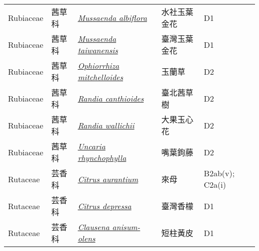 {\begin{longtable}{L{2.5cm}L{2cm}L{5cm}L{2.5cm}L{3cm}}
    Rubiaceae & 茜草科 & \href{http://www.theplantlist.org/tpl1.1/search?q=Mussaenda+albiflora}{\textit{Mussaenda albiflora} } & 水社玉葉金花 & D1    \\
    Rubiaceae & 茜草科 & \href{http://www.theplantlist.org/tpl1.1/search?q=Mussaenda+taiwanensis}{\textit{Mussaenda taiwanensis} } & 臺灣玉葉金花 & D1    \\
    Rubiaceae & 茜草科 & \href{http://www.theplantlist.org/tpl1.1/search?q=Ophiorrhiza+mitchelloides}{\textit{Ophiorrhiza mitchelloides} } & 玉蘭草 & D2    \\
    Rubiaceae & 茜草科 & \href{http://www.theplantlist.org/tpl1.1/search?q=Randia+canthioides}{\textit{Randia canthioides} } & 臺北茜草樹 & D2    \\
    Rubiaceae & 茜草科 & \href{http://www.theplantlist.org/tpl1.1/search?q=Randia+wallichii}{\textit{Randia wallichii} } & 大果玉心花 & D2    \\
    Rubiaceae & 茜草科 & \href{http://www.theplantlist.org/tpl1.1/search?q=Uncaria+rhynchophylla}{\textit{Uncaria rhynchophylla} } & 嘴葉鉤藤 & D2    \\
    Rutaceae & 芸香科 & \href{http://www.theplantlist.org/tpl1.1/search?q=Citrus+aurantium}{\textit{Citrus aurantium} } & 來母 & B2ab(v); C2a(i)    \\
    Rutaceae & 芸香科 & \href{http://www.theplantlist.org/tpl1.1/search?q=Citrus+depressa}{\textit{Citrus depressa} } & 臺灣香檬 & D1    \\
    Rutaceae & 芸香科 & \href{http://www.theplantlist.org/tpl1.1/search?q=Clausena+anisum-olens}{\textit{Clausena anisum-olens} } & 短柱黃皮 & D1    \\

\end{longtable}}
